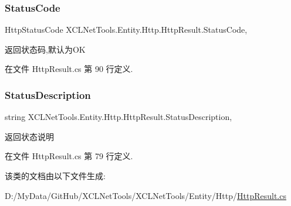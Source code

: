 \subsubsection{\texorpdfstring{Status\+Code}{StatusCode}}
{\footnotesize\ttfamily Http\+Status\+Code X\+C\+L\+Net\+Tools.\+Entity.\+Http.\+Http\+Result.\+Status\+Code\hspace{0.3cm}{\ttfamily [get]}, {\ttfamily [set]}}



返回状态码,默认为\+OK 



在文件 Http\+Result.\+cs 第 90 行定义.

\mbox{\label{class_x_c_l_net_tools_1_1_entity_1_1_http_1_1_http_result_ae52de9f66b0248b366ee38cc9eae5659}} 
\subsubsection{\texorpdfstring{Status\+Description}{StatusDescription}}
{\footnotesize\ttfamily string X\+C\+L\+Net\+Tools.\+Entity.\+Http.\+Http\+Result.\+Status\+Description\hspace{0.3cm}{\ttfamily [get]}, {\ttfamily [set]}}



返回状态说明 



在文件 Http\+Result.\+cs 第 79 行定义.



该类的文档由以下文件生成\+:\begin{DoxyCompactItemize}
\item 
D\+:/\+My\+Data/\+Git\+Hub/\+X\+C\+L\+Net\+Tools/\+X\+C\+L\+Net\+Tools/\+Entity/\+Http/\hyperlink{_http_result_8cs}{Http\+Result.\+cs}\end{DoxyCompactItemize}
